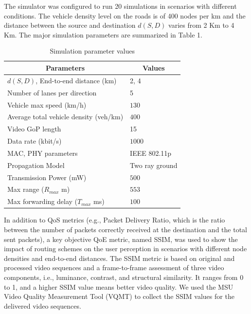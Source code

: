\documentclass{acm_proc_article-sp}
\begin{document}
The simulator was configured to run 20 simulations in scenarios with different conditions. The vehicle density level on the roads is of 400 nodes per km and the distance between the source and destination $d(S,D)$ varies from 2 Km to 4 Km. The major simulation parameters are summarized in Table 1.
\begin{table}[b]
	\label{tab:parameters}
	\begin{center}
	\begin{tabular}{l|l}
	\hline
	\multicolumn{1}{c|}{\textbf{Parameters}} &
	\multicolumn{1}{c}{\textbf{Values}} \\
	\hline
	$d(S,D)$, End-to-end distance (km) & 2, 4 \\
	Number of lanes per direction & 5 \\
	Vehicle max speed (km/h) & $130$\\
	Average total vehicle density (veh/km) & $400$ \\
	Video GoP length &  15\\
	Data rate (kbit/s) & $1000$  \\
	MAC, PHY parameters & IEEE 802.11p \\
	Propagation Model & Two ray ground \\
	Transmission Power (mW) & $500$ \\
	Max range ($R_{max}$ m) & $553$\\
	Max forwarding delay ($T_{max}$ ms) & $100$\\
	\hline
	\end{tabular}
	\caption{Simulation parameter values}
	\end{center}
	\label{tab:parameters}
\end{table}

In addition to QoS metrics (e.g., Packet Delivery Ratio, which is the ratio between the number of packets correctly received at the destination and the total sent packets), a key objective QoE metric, named SSIM, was used to show the impact of routing schemes on the user perception in scenarios with different node densities and end-to-end distances. The SSIM metric is based on original and processed video sequences and a frame-to-frame assessment of three video components, i.e., luminance, contrast, and structural similarity. It ranges from 0 to 1, and a higher SSIM value means better video quality. We used the MSU Video Quality Measurement Tool (VQMT)  to collect the SSIM values for the delivered video sequences.
\end{document}
